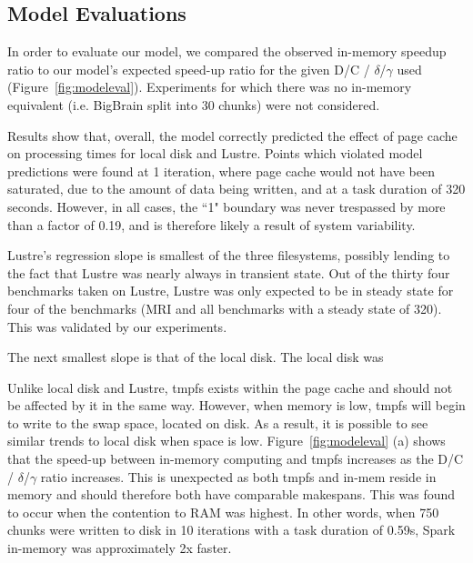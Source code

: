 \documentclass{IEEEtran}
\newcommand{\todo}[1]{\marginpar{\parbox{18mm}{\flushleft\tiny\color{red}\textbf{TODO}:
      #1}}}
\begin{document}
\subsection{Model Evaluations}

In order to evaluate our model, we compared the observed in-memory speedup 
ratio to our model's expected speed-up ratio for the given 
D/C / $\delta$/$\gamma$ used (Figure~\ref{fig:modeleval}). Experiments for 
which there was no in-memory equivalent (i.e. BigBrain split into 30 chunks) 
were not considered.

Results show that, overall, the model correctly predicted the effect of page 
cache on processing times for local disk and Lustre. Points which violated 
model predictions were found at 1 iteration, where page cache would not have 
been saturated, due to the amount of data being written, and at a task duration
of 320 seconds. However, in all cases, the ``1" boundary was never trespassed by 
more than a factor of 0.19, and is therefore likely a result of system 
variability.

Lustre's regression slope is smallest of the three filesystems, possibly 
lending to the fact that Lustre was nearly always in transient state. Out of 
the thirty four benchmarks taken on Lustre, Lustre was only expected to be in steady 
state for four of the benchmarks (MRI and all benchmarks with a steady state of
320). This was validated by our experiments.

The next smallest slope is that of the local disk. The local disk was \todo{continue after disk benchmarks}

Unlike local disk and Lustre, tmpfs exists within the page cache and should not 
be affected by it in the same way. However, when memory is low, tmpfs will 
begin to write to the swap space, located on disk. As a result, it is possible 
to see similar trends to local disk when space is low. 
Figure~\ref{fig:modeleval} (a) shows that the speed-up between in-memory 
computing and tmpfs increases as the D/C / $\delta$/$\gamma$ ratio increases. 
This is unexpected as both tmpfs and in-mem reside in memory and should 
therefore both have comparable makespans. This was found to occur when the 
contention to RAM was highest. In other words, when 750 chunks were written to
disk in 10 iterations with a task duration of 0.59s, Spark in-memory was 
approximately 2x faster. 
\end{document}
